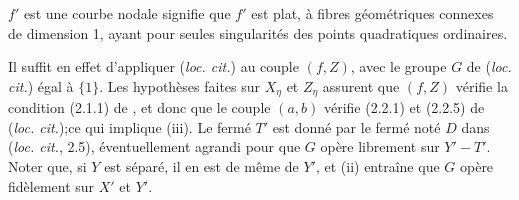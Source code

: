 \documentclass[10pt]{../fichiers-configuration-latex/smfart}
\begin{document}
$f'$ est une courbe nodale signifie que $f'$ est plat, à fibres géométriques connexes de dimension
1, ayant pour seules singularités des points quadratiques ordinaires. 

Il suffit en effet d'appliquer (\textit{loc. cit.}) au couple $(f,Z)$, avec le groupe $G$ de
(\textit{loc. cit.}) égal à $\{1\}$. Les hypothèses faites sur $X_{\eta}$ et $Z_{\eta}$ assurent que
$(f,Z)$ vérifie la condition (2.1.1) de \cite{Families@de_Jong}, et donc que le couple $(a,b)$
vérifie (2.2.1) et (2.2.5) de (\textit{loc. cit.});ce qui implique (iii). Le fermé $T'$ est donné
par le fermé noté $D$ dans (\textit{loc. cit.}, 2.5), éventuellement agrandi pour que $G$ opère
librement sur $Y'-T'$. Noter que, si $Y$ est séparé, il en est de même de $Y'$, et (ii) entraîne que
$G$ opère fidèlement sur $X'$ et $Y'$. 
\end{document}
